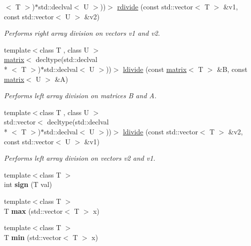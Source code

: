 \begin{DoxyCompactItemize}
$<$ T $>$)$\ast$std\-::declval$<$ U $>$))$>$ \hyperlink{namespacekeycpp_af234cd07a4e1d649629a6b83dbe113ff}{rdivide} (const std\-::vector$<$ T $>$ \&v1, const std\-::vector$<$ U $>$ \&v2)
\begin{DoxyCompactList}\small\item\em Performs right array division on vectors v1 and v2. \end{DoxyCompactList}\item 
{\footnotesize template$<$class T , class U $>$ }\\\hyperlink{classkeycpp_1_1matrix}{matrix}$<$ decltype(std\-::declval\\*
$<$ T $>$)$\ast$std\-::declval$<$ U $>$))$>$ \hyperlink{namespacekeycpp_ac57d32902cba2c399475015235aeccec}{ldivide} (const \hyperlink{classkeycpp_1_1matrix}{matrix}$<$ T $>$ \&B, const \hyperlink{classkeycpp_1_1matrix}{matrix}$<$ U $>$ \&A)
\begin{DoxyCompactList}\small\item\em Performs left array division on matrices B and A. \end{DoxyCompactList}\item 
{\footnotesize template$<$class T , class U $>$ }\\std\-::vector$<$ decltype(std\-::declval\\*
$<$ T $>$)$\ast$std\-::declval$<$ U $>$))$>$ \hyperlink{namespacekeycpp_a7a86bc7e25833cdf9266c038a4edb0ea}{ldivide} (const std\-::vector$<$ T $>$ \&v2, const std\-::vector$<$ U $>$ \&v1)
\begin{DoxyCompactList}\small\item\em Performs left array division on vectors v2 and v1. \end{DoxyCompactList}\item 
\hypertarget{namespacekeycpp_a8f1cd159623e23abeedd26d34fc500d9}{{\footnotesize template$<$class T $>$ }\\int {\bfseries sign} (T val)}\label{namespacekeycpp_a8f1cd159623e23abeedd26d34fc500d9}

\item 
\hypertarget{namespacekeycpp_abebb8d8939a33f6c3cb00be9278114c6}{{\footnotesize template$<$class T $>$ }\\T {\bfseries max} (std\-::vector$<$ T $>$ x)}\label{namespacekeycpp_abebb8d8939a33f6c3cb00be9278114c6}

\item 
\hypertarget{namespacekeycpp_a8ef49e492f67187d0909c7ae093fee48}{{\footnotesize template$<$class T $>$ }\\T {\bfseries min} (std\-::vector$<$ T $>$ x)}\label{namespacekeycpp_a8ef49e492f67187d0909c7ae093fee48}


\end{DoxyCompactItemize}
